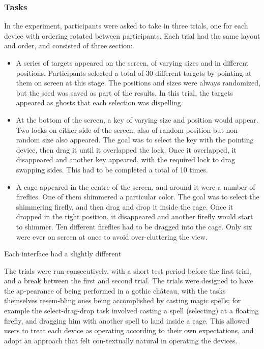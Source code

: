 \subsubsection{Tasks}

In the experiment, participants were asked to take in three trials, one for each device with ordering rotated between participants. Each trial had the same layout and order, and consisted of three section:


\begin{itemize}
\item A series of targets appeared on the screen, of varying sizes and in different positions. Participants selected a total of 30 different targets by pointing at them on screen at this stage. The positions and sizes were always randomized, but the seed was saved as part of the results. In this trial, the targets appeared as ghosts that each selection was dispelling.
\item At the bottom of the screen, a key of varying size and position would appear. Two locks on either side of the screen, also of random position but non-random size also appeared. The goal was to select the key with the pointing device, then drag it until it overlapped the lock. Once it overlapped, it disappeared and another key appeared, with the required lock to drag swapping sides. This had to be completed a total of 10 times.
\item A cage appeared in the centre of the screen, and around it were a number of fireflies. One of them shimmered a particular color. The goal was to select the shimmering firefly, and then drag and drop it inside the cage. Once it dropped in the right position, it disappeared and another firefly would start to shimmer. Ten different fireflies had to be dragged into the cage. Only six were ever on screen at once to avoid over-cluttering the view.
\end{itemize}

Each interface had a slightly different 

The trials were run consecutively, with a short test period before the first trial, and a break between the first and second trial. The trials were designed to have the ap-pearance of being performed in a gothic château, with the tasks themselves resem-bling ones being accomplished by casting magic spells; for example the select-drag-drop task involved casting a spell (selecting) at a floating firefly, and dragging him with another spell to land inside a cage. This allowed users to treat each device as operating according to their own expectations, and adopt an approach that felt con-textually natural in operating the devices.

